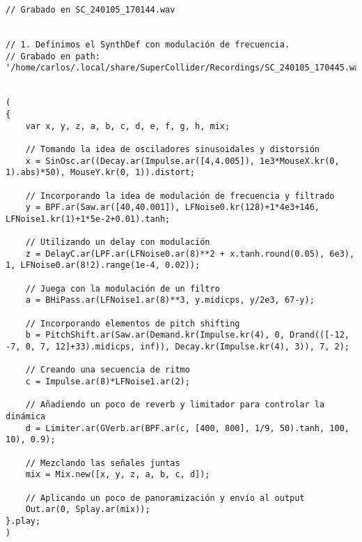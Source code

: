 \begin{minipage}[t]{1\textwidth}
    \centering
    \begin{lstlisting}[style=SuperCollider-IDE, basicstyle=\footnotesize\ttfamily, numbers=none]
// Grabado en SC_240105_170144.wav


// 1. Definimos el SynthDef con modulación de frecuencia.
// Grabado en path: '/home/carlos/.local/share/SuperCollider/Recordings/SC_240105_170445.wav'


(
{
    var x, y, z, a, b, c, d, e, f, g, h, mix;

    // Tomando la idea de osciladores sinusoidales y distorsión
    x = SinOsc.ar((Decay.ar(Impulse.ar([4,4.005]), 1e3*MouseX.kr(0, 1).abs)*50), MouseY.kr(0, 1)).distort;

    // Incorporando la idea de modulación de frecuencia y filtrado
    y = BPF.ar(Saw.ar([40,40.001]), LFNoise0.kr(128)+1*4e3+146, LFNoise1.kr(1)+1*5e-2+0.01).tanh;

    // Utilizando un delay con modulación
    z = DelayC.ar(LPF.ar(LFNoise0.ar(8)**2 + x.tanh.round(0.05), 6e3), 1, LFNoise0.ar(8!2).range(1e-4, 0.02));

    // Juega con la modulación de un filtro
    a = BHiPass.ar(LFNoise1.ar(8)**3, y.midicps, y/2e3, 67-y);

    // Incorporando elementos de pitch shifting
    b = PitchShift.ar(Saw.ar(Demand.kr(Impulse.kr(4), 0, Drand(([-12, -7, 0, 7, 12]+33).midicps, inf)), Decay.kr(Impulse.kr(4), 3)), 7, 2);

    // Creando una secuencia de ritmo
    c = Impulse.ar(8)*LFNoise1.ar(2);

    // Añadiendo un poco de reverb y limitador para controlar la dinámica
    d = Limiter.ar(GVerb.ar(BPF.ar(c, [400, 800], 1/9, 50).tanh, 100, 10), 0.9);

    // Mezclando las señales juntas
    mix = Mix.new([x, y, z, a, b, c, d]);

    // Aplicando un poco de panoramización y envío al output
    Out.ar(0, Splay.ar(mix));
}.play;
)        
    \end{lstlisting}
    \vspace{1cm}
\end{minipage}
























